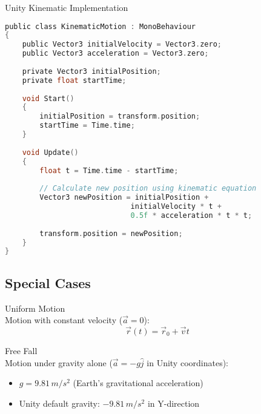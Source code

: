 \begin{code}{Unity Kinematic Implementation}\\
\begin{lstlisting}[language=C, style=basesmol]
public class KinematicMotion : MonoBehaviour 
{
    public Vector3 initialVelocity = Vector3.zero;
    public Vector3 acceleration = Vector3.zero;
    
    private Vector3 initialPosition;
    private float startTime;
    
    void Start() 
    {
        initialPosition = transform.position;
        startTime = Time.time;
    }
    
    void Update() 
    {
        float t = Time.time - startTime;
        
        // Calculate new position using kinematic equation
        Vector3 newPosition = initialPosition + 
                             initialVelocity * t + 
                             0.5f * acceleration * t * t;
        
        transform.position = newPosition;
    }
}
\end{lstlisting}
\end{code}

\subsection{Special Cases}

\begin{definition}{Uniform Motion}\\
    Motion with constant velocity ($\vec{a} = 0$):
    $$\vec{r}(t) = \vec{r}_0 + \vec{v}t$$
\end{definition}

\begin{definition}{Free Fall}\\
    Motion under gravity alone ($\vec{a} = -g\hat{j}$ in Unity coordinates):
    \begin{itemize}
        \item $g = 9.81 \, m/s^2$ (Earth's gravitational acceleration)
        \item Unity default gravity: $-9.81 \, m/s^2$ in Y-direction
    \end{itemize}
\end{definition}

